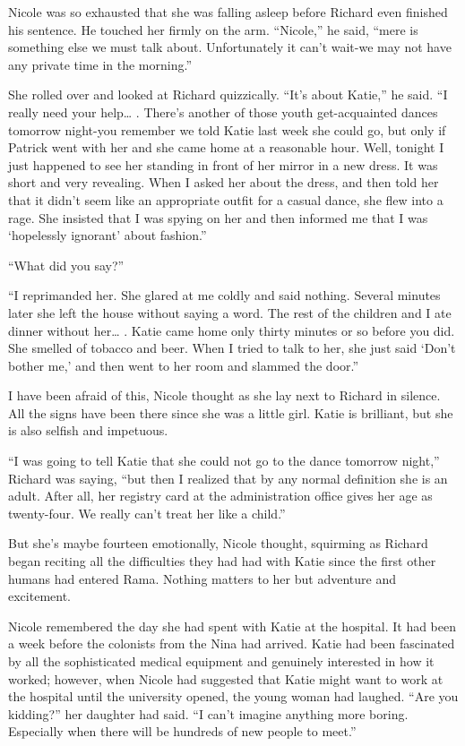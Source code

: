 \documentclass[]{article}
\begin{document}
{Nicole was so exhausted that she was falling asleep before Richard even finished his sentence.  He touched her firmly on the arm.  “Nicole,” he said, “mere is something else we must talk about.  Unfortunately it can’t wait-we may not have any private time in the morning.”

She rolled over and looked at Richard quizzically.  “It’s about Katie,” he said.  “I really need your help… .  There’s another of those youth get-acquainted dances tomorrow night-you remember we told Katie last week she could go, but only if Patrick went with her and she came home at a reasonable hour.  Well, tonight I just happened to see her standing in front of her mirror in a new dress.  It was short and very revealing.  When I asked her about the dress, and then told her that it didn’t seem like an appropriate outfit for a casual dance, she flew into a rage.  She insisted that I was spying on her and then informed me that I was ‘hopelessly ignorant’ about fashion.”

“What did you say?”

“I reprimanded her.  She glared at me coldly and said nothing.  Several minutes later she left the house without saying a word.  The rest of the children and I ate dinner without her… .  Katie came home only thirty minutes or so before you did.  She smelled of tobacco and beer.  When I tried to talk to her, she just said ‘Don’t bother me,’ and then went to her room and slammed the door.”

I have been afraid of this, Nicole thought as she lay next to Richard in silence.  All the signs have been there since she was a little girl.  Katie is brilliant, but she is also selfish and impetuous.

“I was going to tell Katie that she could not go to the dance tomorrow night,” Richard was saying, “but then I realized that by any normal definition she is an adult.  After all, her registry card at the administration office gives her age as twenty-four.  We really can’t treat her like a child.”

But she’s maybe fourteen emotionally, Nicole thought, squirming as Richard began reciting all the difficulties they had had with Katie since the first other humans had entered Rama.  Nothing matters to her but adventure and excitement.

Nicole remembered the day she had spent with Katie at the hospital.  It had been a week before the colonists from the Nina had arrived.  Katie had been fascinated by all the sophisticated medical equipment and genuinely interested in how it worked; however, when Nicole had suggested that Katie might want to work at the hospital until the university opened, the young woman had laughed.  “Are you kidding?” her daughter had said.  “I can’t imagine anything more boring.  Especially when there will be hundreds of new people to meet.”

}
\end{document}
